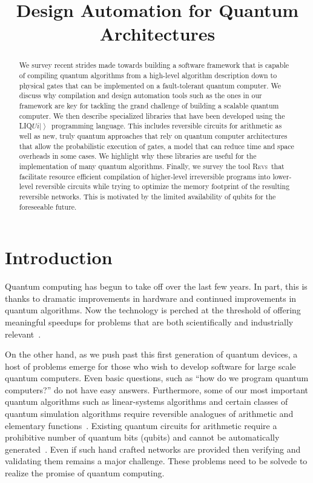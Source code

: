 \documentclass[conference]{IEEEtran}
\title{Design Automation for Quantum Architectures}
\author{%
  \IEEEauthorblockN{Martin Roetteler \qquad Krysta M. Svore \qquad Nathan Wiebe}
  \IEEEauthorblockA{%
Microsoft Research, Redmond, WA, USA
  }
}
\newcommand{\ket}[1]{\left| #1\right\rangle}        %
\newcommand{\Liquid}{LIQ$Ui\ket{}$\ }
\newcommand{\REVS}{{\textsc{Revs}}}
\begin{document}
\maketitle

\begin{abstract}
We survey recent strides made towards building a software framework that is capable of compiling quantum algorithms from a high-level algorithm description down to physical gates that can be implemented on a fault-tolerant quantum computer. We discuss why compilation and design automation tools such as the ones in our framework are key for tackling the grand challenge of building a scalable quantum computer. We then describe specialized libraries that have been developed using the \Liquid programming language. This includes reversible circuits for arithmetic as well as new, truly quantum approaches that rely on quantum computer architectures that allow the probabilistic execution of gates, a model that can reduce time and space overheads in some cases. We highlight why these libraries are useful for the implementation of many quantum algorithms. Finally, we survey the tool \REVS~that facilitate resource efficient compilation of higher-level irreversible programs into lower-level reversible circuits while trying to optimize the memory footprint of the resulting reversible networks. This is motivated by the limited availability of qubits for the foreseeable future. 
\end{abstract}

\section{Introduction}
Quantum computing has begun to take off over the last few years. In part, this is thanks to dramatic improvements in hardware and continued improvements in quantum algorithms.  Now the technology
is perched at the threshold of offering meaningful speedups for problems that are both scientifically and industrially relevant~\cite{barends2014superconducting,cross2015quantum,o2016scalable,benedetti2016estimation}.  

On the other hand, as we push past this first generation of quantum devices, a host of problems emerge for those who wish to develop software for large scale quantum computers.  Even basic questions, such as ``how do we program quantum computers?'' do not have easy answers.  Furthermore, some of our most important quantum algorithms such as linear-systems algorithms and certain classes of quantum simulation algorithms require reversible analogues of arithmetic and elementary functions~\cite{harrow2009quantum,babbush2015exponentially,kivlichan2016bounding}. Existing quantum circuits for arithmetic require a prohibitive number of quantum bits (qubits) and cannot be automatically generated~\cite{BHP+15}.  Even if such hand crafted networks are provided then verifying and validating them remains a major challenge.  These problems need to be solvede to realize the promise of quantum computing.
\end{document}
